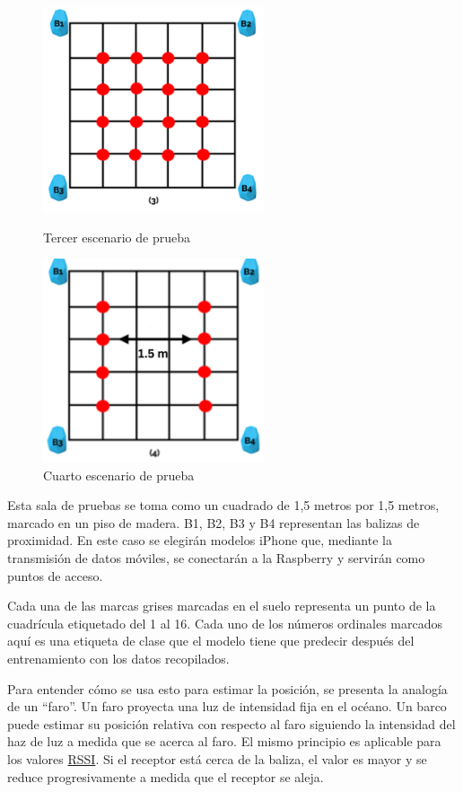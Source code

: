 \begin{figure}[H]
    \begin{minipage}[b]{0.45\textwidth}
        \centering
    \includegraphics[width=6.5cm]{figs/cuatro_apes}
        \caption{Tercer escenario de prueba}
        \label{fig:escenario3}
    \end{minipage}
    \hfill
    \begin{minipage}[b]{0.45\textwidth}
        \centering
    \includegraphics[width=6.5cm]{figs/cuatro_apes_espaciados}
        \caption{Cuarto escenario de prueba}
        \label{fig:escenario4}
    \end{minipage}
\end{figure}


Esta sala de pruebas se toma como un cuadrado de 1,5 metros por 1,5 metros, marcado en un piso de madera. B1, B2, B3 y B4 representan las balizas de proximidad. En este caso se elegirán modelos iPhone que, mediante la transmisión de datos móviles, se conectarán a la Raspberry y servirán como puntos de acceso.

Cada una de las marcas grises marcadas en el suelo representa un punto de la cuadrícula etiquetado del 1 al 16. Cada uno de los números ordinales marcados aquí es una etiqueta de clase que el modelo tiene que predecir después del entrenamiento con los datos recopilados.

Para entender cómo se usa esto para estimar la posición, se presenta la analogía de un “faro”. Un faro proyecta una luz de intensidad fija en el océano. Un barco puede estimar su posición relativa con respecto al faro siguiendo la intensidad del haz de luz a medida que se acerca al faro. El mismo principio es aplicable para los valores \hyperlink{RSSI}{RSSI}. Si el receptor está cerca de la baliza, el valor es mayor y se reduce progresivamente a medida que el receptor se aleja.

